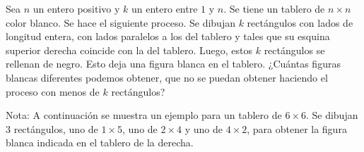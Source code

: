 Sea $n$ un entero positivo y $k$ un entero entre $1$ y $n$. Se tiene un tablero de $n \times n$ color blanco. Se hace el siguiente proceso. Se dibujan $k$ rectángulos con lados de longitud entera, con lados paralelos a los del tablero y tales que su esquina superior derecha coincide con la del tablero. Luego, estos $k$ rectángulos se rellenan de negro. Esto deja una figura blanca en el tablero.
¿Cuántas figuras blancas diferentes podemos obtener, que no se puedan obtener haciendo el proceso con menos de $k$ rectángulos?

Nota: A continuación se muestra un ejemplo para un tablero de $6 \times 6$. Se dibujan $3$ rectángulos, uno de $1 \times 5$, uno de $2 \times 4$ y uno de $4 \times 2$, para obtener la figura blanca indicada en el tablero de la derecha.